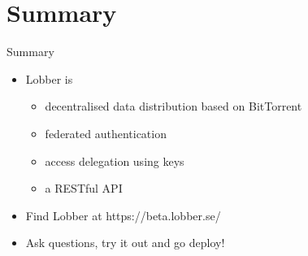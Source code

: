 \documentclass{beamer}
\begin{document}
\section*{Summary}

\begin{frame}{Summary}
  \begin{itemize}
  \item
    Lobber is
    \begin{itemize}
    \item
      decentralised data distribution based on BitTorrent
    \item
      federated authentication 
    \item
      access delegation using keys
    \item
      a RESTful API
    \end{itemize}
  \item
    Find Lobber at https://beta.lobber.se/
  \item
    Ask questions, try it out and go deploy!
  \end{itemize}
\end{frame}  
\end{document}
